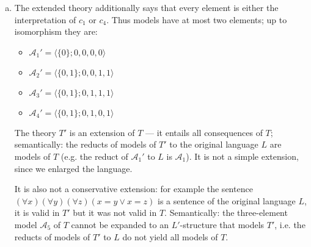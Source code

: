 \begin{problem}
\begin{solution}
\begin{enumerate}[(a)]
            \item The extended theory additionally says that every element is either the interpretation of $c_1$ or $c_4$. Thus models have at most two elements; up to isomorphism they are:
            \begin{itemize}
                \item $\mathcal A_1'=\langle\{0\};0,0,0,0\rangle$
                \item $\mathcal A_2'=\langle\{0,1\};0,0,1,1\rangle$
                \item $\mathcal A_3'=\langle\{0,1\};0,1,1,1\rangle$
                \item $\mathcal A_4'=\langle\{0,1\};0,1,0,1\rangle$                
            \end{itemize}
            The theory $T'$ is an extension of $T$ — it entails all consequences of $T$; semantically: the reducts of models of $T'$ to the original language $L$ are models of $T$ (e.g. the reduct of $\mathcal A_1'$ to $L$ is $\mathcal A_1$). It is not a simple extension, since we enlarged the language.
            
            It is also not a conservative extension: for example the sentence $(\forall x)(\forall y)(\forall z)(x=y\lor x=z)$ is a sentence of the original language $L$, it is valid in $T'$ but it was not valid in $T$. Semantically: the three-element model $\mathcal A_5$ of $T$ cannot be expanded to an $L'$-structure that models $T'$, i.e. the reducts of models of $T'$ to $L$ do not yield all models of $T$.

        \end{enumerate}
                    
    \end{solution}

\end{problem}


